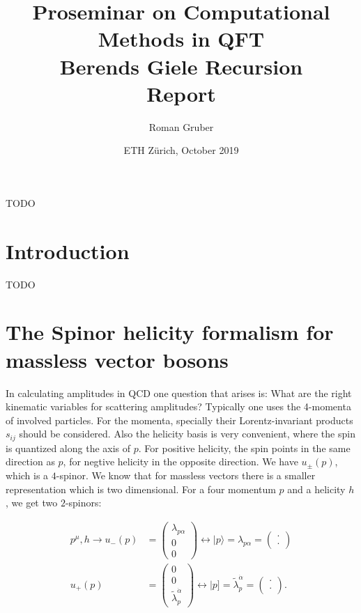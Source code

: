 \documentclass{article}
\title{Proseminar on Computational Methods in QFT \\ Berends Giele Recursion \\ Report}
\author{Roman Gruber}
\date{ETH Zürich, October 2019}
\theoremstyle{definition}
\numberwithin{equation}{section}
\begin{document}
\maketitle

\abstract 
TODO
\newline

\doclicenseThis

\noindent\textcolor{gray}{\hrulefill}

\tableofcontents

\noindent\textcolor{gray}{\hrulefill}

\section{Introduction}

TODO

\section{The Spinor helicity formalism for massless vector bosons}

In calculating amplitudes in QCD one question that arises is: What are the right kinematic variables for scattering amplitudes? Typically one uses the 4-momenta of involved particles. For the momenta, specially their Lorentz-invariant products $s_{ij}$ should be considered. Also the helicity basis \cite{berends81} is very convenient, where the spin is quantized along the axis of $p$. For positive helicity, the spin points in the same direction as $p$, for negtive helicity in the opposite direction. We have $u_{\pm}(p)$, which is a $4$-spinor. We know that for massless vectors there is a smaller representation which is two dimensional. For a four momentum $p$ and a helicity $h$, we get two $2$-spinors:

\begin{align*}
    p^{\mu}, h \rightarrow u_{-}(p) &= \begin{pmatrix} \lambda_{p \alpha} \\ 0 \\ 0\end{pmatrix} \leftrightarrow | p \rangle = \lambda_{p \alpha} = \begin{pmatrix}\cdot \\ \cdot\end{pmatrix} \\
    u_{+}(p) &= \begin{pmatrix}0 \\ 0 \\ \tilde{\lambda}_{p}^{\dot{\alpha}} \end{pmatrix} \leftrightarrow | p \rbrack = \tilde{\lambda}^{\dot{\alpha}}_p = \begin{pmatrix}\cdot \\ \cdot\end{pmatrix}.
\end{align*}
\end{document}
